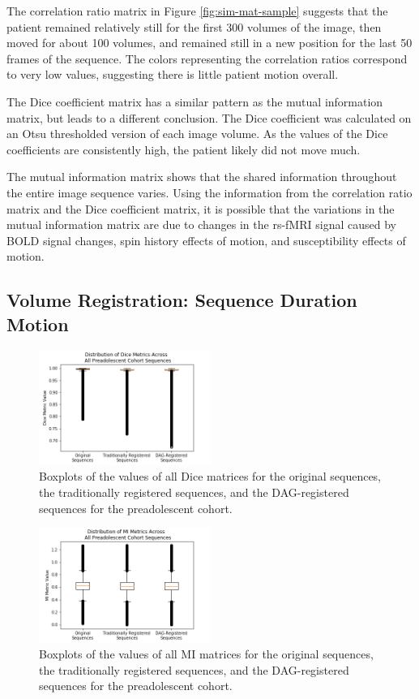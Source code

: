 The correlation ratio matrix in Figure \ref{fig:sim-mat-sample} suggests that the patient remained relatively still for the first 300 volumes of the image, then moved for about 100 volumes, and remained still in a new position for the last 50 frames of the sequence. The colors representing the correlation ratios correspond to very low values, suggesting there is little patient motion overall.

The Dice coefficient matrix has a similar pattern as the mutual information matrix, but leads to a different conclusion. The Dice coefficient was calculated on an Otsu thresholded version of each image volume. As the values of the Dice coefficients are consistently high, the patient likely did not move much. 

The mutual information matrix shows that the shared information throughout the entire image sequence varies. Using the information from the correlation ratio matrix and the Dice coefficient matrix, it is possible that the variations in the mutual information matrix are due to changes in the rs-fMRI signal caused by BOLD signal changes, spin history effects of motion, and susceptibility effects of motion.

\subsection{Volume Registration: Sequence Duration Motion}

\begin{figure}
\centering
\includegraphics[width=0.5\textwidth]{6/figures/preads-dice-box.png}
\caption{Boxplots of the values of all Dice matrices for the original sequences, the traditionally registered sequences, and the DAG-registered sequences for the preadolescent cohort.}
\label{fig:preads-dice-box}
\end{figure}

\begin{figure}
\centering
\includegraphics[width=0.5\textwidth]{6/figures/preads-mi-box.png}
\caption{Boxplots of the values of all MI matrices for the original sequences, the traditionally registered sequences, and the DAG-registered sequences for the preadolescent cohort.}
\label{fig:preads-mi-box}
\end{figure}

